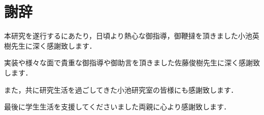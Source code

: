 \chapter{謝辞}

本研究を遂行するにあたり，日頃より熱心な御指導，御鞭撻を頂きました小池英樹先生に深く感謝致します．

実装や様々な面で貴重な御指導や御助言を頂きました佐藤俊樹先生に深く感謝致します．

また，共に研究生活を過ごしてきた小池研究室の皆様にも感謝致します．

最後に学生生活を支援してくださいました両親に心より感謝致します．

